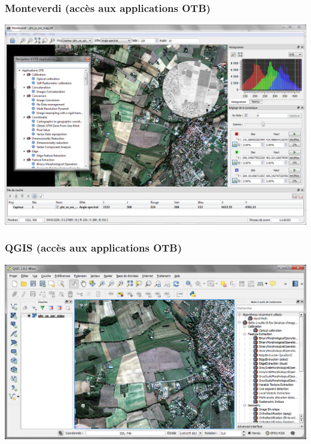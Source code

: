 \documentclass[8pt]{beamer}
\begin{document}
\begin{frame}
\frametitle{Monteverdi (accès aux applications OTB)}
\begin{minipage}[t][6cm][t]{\textwidth}
\begin{center}
\includegraphics[width=1.0\textwidth]{images/monteverdi.png}
\end{center}
\end{minipage}
\end{frame}

\begin{frame}
  \frametitle{QGIS (accès aux applications OTB)}
\begin{minipage}[t][6cm][t]{\textwidth}
\begin{center}
\includegraphics[width=1\textwidth]{images/otb_in_qgis.png}
\end{center}
\end{minipage}
\end{frame}
\end{document}
